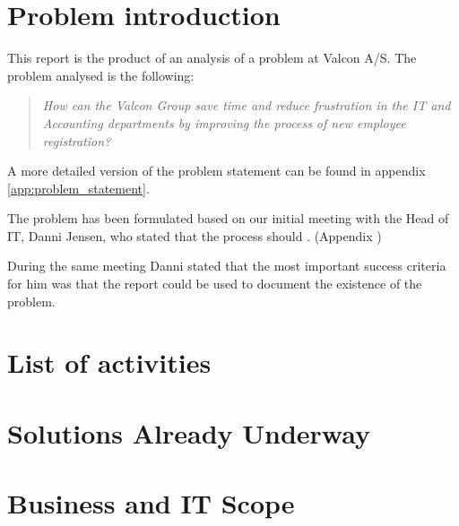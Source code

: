 \section{Problem introduction}
This report is the product of an analysis of a problem at Valcon A/S.
The problem analysed is the following:

\begin{quotation}
\emph{How can the Valcon Group save time and reduce frustration in the IT and Accounting departments by improving the process of new employee registration?}
\end{quotation}

\noindent A more detailed version of the problem statement can be found in appendix \ref{app:problem_statement}.

The problem has been formulated based on our initial meeting with the Head of IT, Danni Jensen, who stated that the process should . (Appendix )

During the same meeting Danni stated that the most important success criteria for him was that the report could be used to document the existence of the problem.

\section{List of activities}


\section{Solutions Already Underway}


\section{Business and IT Scope}

